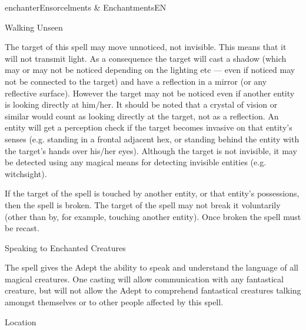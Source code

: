 \begin{College}[1.1]{enchanter}{Ensorcelments \& Enchantments}{EN}
\begin{spell}[G-4]{Walking Unseen}

\begin{effects}
The target of this spell may move unnoticed, not invisible.  This
means that it will not transmit light. As a consequence the target
will cast a shadow (which may or may not be noticed depending on the
lighting etc — even if noticed may not be connected to the target) and
have a reflection in a mirror (or any reflective surface).  However
the target may not be noticed even if another entity is looking
directly at him/her.  It should be noted that a crystal of vision or
similar would count as looking directly at the target, not as a
reflection.  An entity will get a perception check if the target
becomes invasive on that entity’s senses (e.g. standing in a frontal
adjacent hex, or standing behind the entity with the target’s hands
over his/her eyes). Although the target is not invisible, it may be
detected using any magical means for detecting invisible entities
(e.g. witchsight).

If the target of the spell is touched by another entity, or that
entity’s possessions, then the spell is broken.  The target of the
spell may not break it voluntarily (other than by, for example,
touching another entity).  Once broken the spell must be recast.
\end{effects}
\end{spell}

\begin{spell}[G-5]{Speaking to Enchanted Creatures}

\begin{effects}
The spell gives the Adept the ability to speak and understand the
language of all magical creatures.  One casting will allow
communication with any fantastical creature, but will not allow the
Adept to comprehend fantastical creatures talking amongst themselves
or to other people affected by this spell.
\end{effects}
\end{spell}

\begin{spell}[G-6]{Location}


\end{spell}
\end{College}
